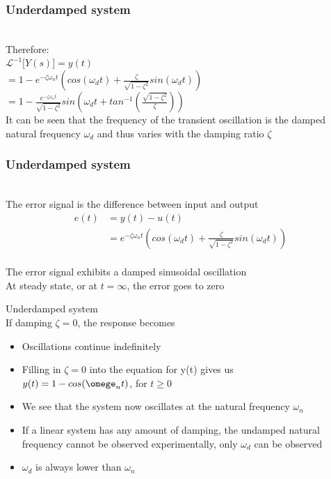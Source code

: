 \begin{frame}
\frametitle{Underdamped system}
\\Therefore:\\ 
\vspace{0.25cm}
$\mathcal{L}^{-1}\Big[Y(s)\Big]=y(t)$
\vspace{0.35cm}
\pause
\\$ = 1 - e^{-\zeta\omega_n t}(cos(\omega_d t)+\frac{\zeta}{\sqrt{1 - \zeta^2}}sin(\omega_d t))$
\vspace{0.25cm}
\\$ = 1 - \frac{e^{-\zeta\omega_n t}}{\sqrt{1-\zeta^2}}sin(\omega_d t+ tan^{-1}(\frac{\sqrt{1-\zeta^2}}{\zeta}))$
\vspace{0.4cm}
\pause
\\ It can be seen that the frequency of the transient oscillation is the damped natural frequency $\omega_d$ and thus varies with the damping ratio $\zeta$
\end{frame}

\begin{frame}
\frametitle{Underdamped system}
\\ The error signal is the difference between input and output
\begin{align*}
e(t)&= y(t) -u(t)
\\&= e^{-\zeta\omega_n t}(cos(\omega_d t)+\frac{\zeta}{\sqrt{1 - \zeta^2}}sin(\omega_d t))
\end{align*}
\pause
\\ The error signal exhibits a damped sinusoidal oscillation
\vspace{0.8cm}
\pause
\\ At steady state, or at $t=\infty$, the error goes to zero
\end{frame}

\begin{frame}{Underdamped system}
\vspace{-0.5cm}
\\ If damping $\zeta=0$, the response becomes 
\pause
\begin{itemize}
\vspace{0.25cm}
\item Oscillations continue indefinitely
\vspace{0.5cm}
\pause
\item Filling in $\zeta=0$ into the equation for y(t) gives us
\\ $y(t) = 1 -cos(\omege_n t)$, for $t\ge 0$
\vspace{0.5cm}
\pause
\item We see that the system now oscillates at the natural frequency $\omega_n$
\pause
\vspace{0.5cm}
\item If a linear system has any amount of damping, the undamped natural frequency cannot be observed experimentally, only $\omega_d$ can be observed
\pause
\vspace{0.5cm}
\item $\omega_d$ is always lower than $\omega_n$
\end{itemize} 
\end{frame}


